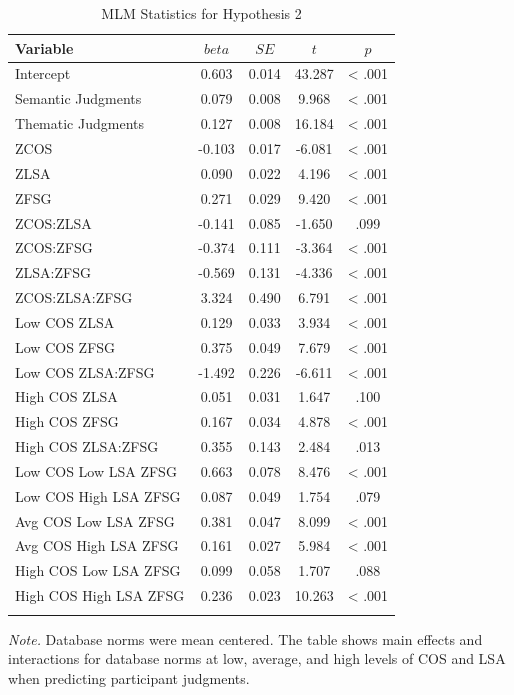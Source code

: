 \documentclass[english,man]{apa6}
\theoremstyle{definition}
\theoremstyle{definition}
\theoremstyle{definition}
\theoremstyle{remark}
\begin{document}
\begin{table}[tbp]
\begin{center}
\begin{threeparttable}
\caption{\label{tab:hyp2-table}MLM Statistics for Hypothesis 2}
\small{
\begin{tabular}{lcccc}
\toprule
Variable & \multicolumn{1}{c}{$beta$} & \multicolumn{1}{c}{$SE$} & \multicolumn{1}{c}{$t$} & \multicolumn{1}{c}{$p$}\\
\midrule
Intercept & 0.603 & 0.014 & 43.287 & < .001\\
Semantic Judgments & 0.079 & 0.008 & 9.968 & < .001\\
Thematic Judgments & 0.127 & 0.008 & 16.184 & < .001\\
ZCOS & -0.103 & 0.017 & -6.081 & < .001\\
ZLSA & 0.090 & 0.022 & 4.196 & < .001\\
ZFSG & 0.271 & 0.029 & 9.420 & < .001\\
ZCOS:ZLSA & -0.141 & 0.085 & -1.650 & .099\\
ZCOS:ZFSG & -0.374 & 0.111 & -3.364 & < .001\\
ZLSA:ZFSG & -0.569 & 0.131 & -4.336 & < .001\\
ZCOS:ZLSA:ZFSG & 3.324 & 0.490 & 6.791 & < .001\\
Low COS ZLSA & 0.129 & 0.033 & 3.934 & < .001\\
Low COS ZFSG & 0.375 & 0.049 & 7.679 & < .001\\
Low COS ZLSA:ZFSG & -1.492 & 0.226 & -6.611 & < .001\\
High COS ZLSA & 0.051 & 0.031 & 1.647 & .100\\
High COS ZFSG & 0.167 & 0.034 & 4.878 & < .001\\
High COS ZLSA:ZFSG & 0.355 & 0.143 & 2.484 & .013\\
Low COS Low LSA ZFSG & 0.663 & 0.078 & 8.476 & < .001\\
Low COS High LSA ZFSG & 0.087 & 0.049 & 1.754 & .079\\
Avg COS Low LSA ZFSG & 0.381 & 0.047 & 8.099 & < .001\\
Avg COS High LSA ZFSG & 0.161 & 0.027 & 5.984 & < .001\\
High COS Low LSA ZFSG & 0.099 & 0.058 & 1.707 & .088\\
High COS High LSA ZFSG & 0.236 & 0.023 & 10.263 & < .001\\
\bottomrule
\addlinespace
\end{tabular}
}
\begin{tablenotes}[para]
\textit{Note.} Database norms were mean centered. The table shows main effects and interactions for database norms at low, average, and high levels of COS and LSA when predicting participant judgments.
\end{tablenotes}
\end{threeparttable}
\end{center}
\end{table}
\end{document}

